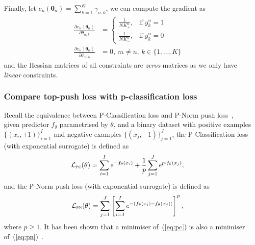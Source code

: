 \documentclass[9pt]{extarticle}
\newcommand{\1}{\mathbf{1}}
\newcommand{\LCal}{\mathcal{L}}
\newcommand{\thetabm}{\bm{\theta}}
\begin{document}
Finally, let $c_n(\thetabm_n) = \sum_{k=1}^K \gamma_{n,k}$,
we can compute the gradient as
\begin{align*}
\frac{\partial c_n(\thetabm_n)} {\partial \theta_{n,k}} 
&= 
\begin{cases}
\frac{1}{N K_+^n}, & \text{if} \ y_k^n = 1 \\
\frac{1}{N K_-^n}, & \text{if} \ y_k^n = 0
\end{cases} \\
%
\frac{\partial c_n(\thetabm_n)} {\partial \theta_{m,k}} &= 0, \ m \neq n, \, k \in \{1,\dots,K\}
\end{align*}
and the Hessian matrices of all constraints are \emph{zeros} matrices as we only have \emph{linear} constraints.


\subsubsection{Compare top-push loss with p-classification loss}
\label{sssec:tp_vs_pc}

Recall the equivalence between P-Classification loss and P-Norm push loss~\cite{ertekin2011equivalence}, 
given predictor $f_\theta$ parametrised by $\theta$, 
and a binary dataset with positive examples $\{(x_i, +1)\}_{i=1}^I$ and negative examples $\{(x_j, -1)\}_{j=1}^J$,
the P-Classification loss (with exponential surrogate) is defined as
\begin{equation}
\label{eq:pc}
\LCal_\textsc{pc}(\theta) = \sum_{i=1}^I e^{-f_\theta(x_i)} + \frac{1}{p} \sum_{j=1}^J e^{p \cdot f_\theta(x_j)},
\end{equation}
and the P-Norm push loss (with exponential surrogate) is defined as
\begin{equation}
\label{eq:pn}
\LCal_\textsc{pn}(\theta) = \sum_{j=1}^J \left[ \sum_{i=1}^I e^{-(f_\theta(x_i) - f_\theta(x_j))} \right]^p,
\end{equation}
where $p \ge 1$.
It has been shown that a minimiser of~(\ref{eq:pc}) is also a minimiser of~(\ref{eq:pn})~\cite{ertekin2011equivalence}.
\end{document}
